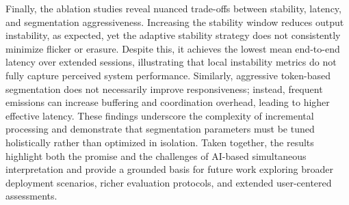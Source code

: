 Finally, the ablation studies reveal nuanced trade-offs between stability, latency, and segmentation aggressiveness. Increasing the stability window reduces output instability, as expected, yet the adaptive stability strategy does not consistently minimize flicker or erasure. Despite this, it achieves the lowest mean end-to-end latency over extended sessions, illustrating that local instability metrics do not fully capture perceived system performance. Similarly, aggressive token-based segmentation does not necessarily improve responsiveness; instead, frequent emissions can increase buffering and coordination overhead, leading to higher effective latency. These findings underscore the complexity of incremental processing and demonstrate that segmentation parameters must be tuned holistically rather than optimized in isolation. Taken together, the results highlight both the promise and the challenges of AI-based simultaneous interpretation and provide a grounded basis for future work exploring broader deployment scenarios, richer evaluation protocols, and extended user-centered assessments.